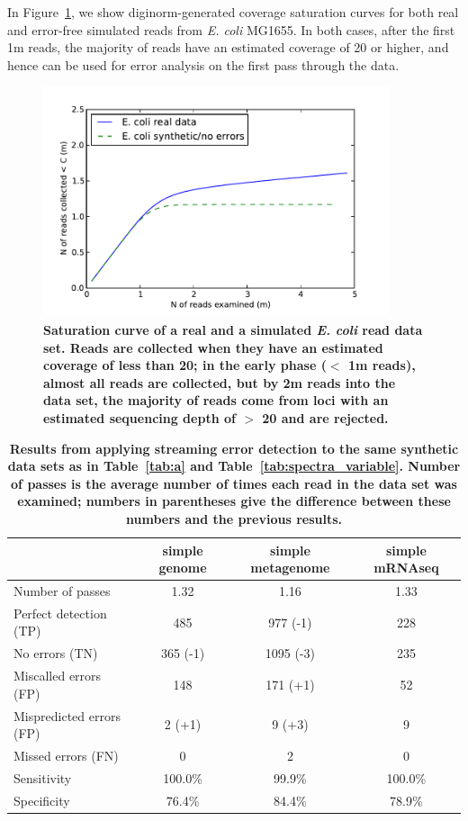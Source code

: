 \documentclass{article}
\begin{document}
In Figure~\ref{fig:saturation}, we show diginorm-generated coverage
saturation curves for both real and error-free simulated reads from
{\em E. coli} MG1655.  In both cases, after the first 1m reads, the
majority of reads have an estimated coverage of 20 or higher, and
hence can be used for error analysis on the first pass through the
data.

\begin{figure}[!ht]
 \centerline{\includegraphics[width=4in]{./figures/saturation}}
\caption{\bf Saturation curve of a real and a simulated {\em E. coli}
  read data set.  Reads are collected when they have an estimated
  coverage of less than 20; in the early phase ($<$ 1m reads), almost
  all reads are collected, but by 2m reads into the data set, the
  majority of reads come from loci with an estimated sequencing depth
  of $>$ 20 and are rejected.}
\label{fig:saturation}
\end{figure}


\begin{table}
\begin{tabular}{|l|c||c||c|}
\hline
& {\bf simple genome} & {\bf simple metagenome} & {\bf simple mRNAseq} \\
\hline
Number of passes & 1.32 & 1.16 & 1.33 \\
\hline
Perfect detection (TP) & 485 & 977 (-1) & 228 \\
No errors (TN) & 365 (-1) & 1095 (-3) & 235 \\
Miscalled errors (FP) & 148 & 171 (+1) & 52 \\
Mispredicted errors (FP) & 2 (+1) & 9 (+3) & 9 \\
Missed errors (FN) & 0 & 2 & 0 \\
\hline
Sensitivity & 100.0\% & 99.9\% & 100.0\% \\
Specificity & 76.4\% & 84.4\% & 78.9\% \\
\hline
\end{tabular}
\caption{{\bf Results from applying streaming error detection to the
    same synthetic data sets as in Table~\ref{tab:a} and
    Table~\ref{tab:spectra_variable}.  Number of passes is the average
    number of times each read in the data set was examined; numbers in
    parentheses give the difference between these numbers and the
    previous results.}}
\label{tab:spectra_streaming}

\end{table}
\end{document}
